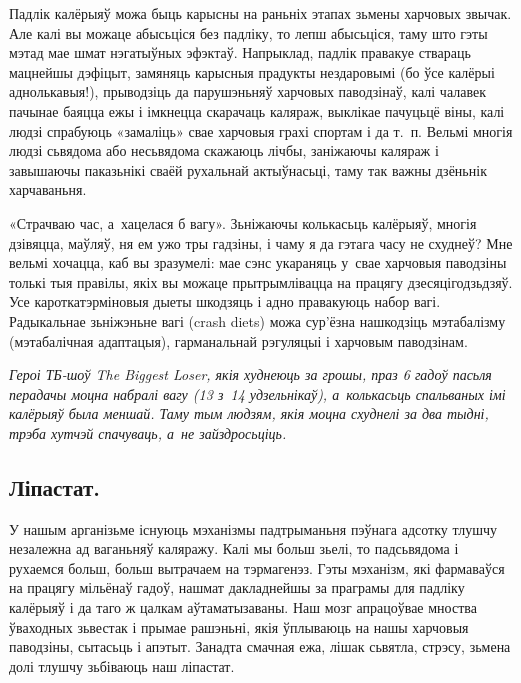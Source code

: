 Падлік калёрыяў можа быць карысны на раньніх этапах зьмены харчовых звычак. Але калі вы можаце абысьціся без падліку, то лепш абысьціся, таму што гэты мэтад мае шмат нэгатыўных эфэктаў. Напрыклад, падлік правакуе ствараць мацнейшы дэфіцыт, замяняць карысныя прадукты нездаровымі (бо ўсе калёрыі аднолькавыя!), прыводзіць да парушэньняў харчовых паводзінаў, калі чалавек пачынае баяцца ежы і імкнецца скарачаць каляраж, выклікае пачуцьцё віны, калі людзі спрабуюць «замаліць» свае харчовыя грахі спортам і да т.~п. Вельмі многія людзі сьвядома або несьвядома скажаюць лічбы, заніжаючы каляраж і завышаючы паказьнікі сваёй рухальнай актыўнасьці, таму так важны дзёньнік харчаваньня.

«Страчваю час, а~хацелася б вагу». Зьніжаючы колькасьць калёрыяў, многія дзівяцца, маўляў, ня ем ужо тры гадзіны, і чаму я да гэтага часу не схуднеў? Мне вельмі хочацца, каб вы зразумелі: мае сэнс укараняць у~свае харчовыя паводзіны толькі тыя правілы, якіх вы можаце прытрымлівацца на працягу дзесяцігодзьдзяў. Усе кароткатэрміновыя дыеты шкодзяць і адно правакуюць набор вагі. Радыкальнае зьніжэньне вагі (crash diets) можа сур'ёзна нашкодзіць мэтабалізму (мэтабалічная адаптацыя), гарманальнай рэгуляцыі і харчовым паводзінам.

\emph{Героі ТБ-шоў The Biggest Loser, якія худнеюць за грошы, праз 6 гадоў пасьля перадачы моцна набралі вагу (13 з~14 удзельнікаў), а~колькасьць спальваных імі калёрыяў была меншай. Таму тым людзям, якія моцна схуднелі за два тыдні, трэба хутчэй спачуваць, а~не зайздросьціць.}

\subsection*{Ліпастат.}
У нашым арганізьме існуюць мэханізмы падтрыманьня пэўнага адсотку тлушчу незалежна ад ваганьняў каляражу. Калі мы больш зьелі, то падсьвядома і рухаемся больш, больш вытрачаем на тэрмагенэз. Гэты мэханізм, які фармаваўся на працягу мільёнаў гадоў, нашмат дакладнейшы за праграмы для падліку калёрыяў і да таго ж цалкам аўтаматызаваны. Наш мозг апрацоўвае мноства ўваходных зьвестак і прымае рашэньні, якія ўплываюць на нашы харчовыя паводзіны, сытасьць і апэтыт. Занадта смачная ежа, лішак сьвятла, стрэсу, зьмена долі тлушчу зьбіваюць наш ліпастат.


